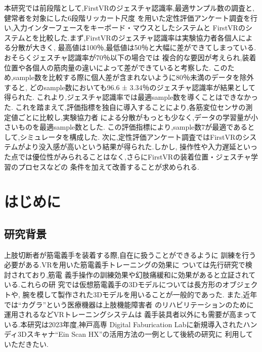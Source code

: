 \documentclass{ltjsreport}
\begin{document}
本研究では前段階として,FirstVRのジェスチャ認識率,最適サンプル数の調査と,健常者を対象にした6段階リッカート尺度
を用いた定性評価アンケート調査を行い,入力インターフェースをキーボード・マウスとしたシステムと
FirstVRのシステムとを比較した.まず,FirstVRのジェスチャ認識率は実験協力者各個人による分散が大きく,
最高値は100％,最低値は50％と大幅に差ができてしまっている.おそらくジェスチャ認識率が70％以下の場合では
複合的な要因が考えられ,装着位置や各個人の筋肉量の違いによって差ができていると考察した.
このため,sample数を比較する際に個人差が含まれないように80％未満のデータを除外すると,
どのsample数においても96.6 ± 3.34％のジェスチャ認識率が結果として得られた.
これより,ジェスチャ認識率では最適sample数を導くことはできなかった.
これを踏まえて,評価指標を独自に導入することにより,各筋変位センサの測定値ごとに比較し,実験協力者
による分散がもっとも少なく,データの学習量が小さいものを最適sample数とした.
この評価指標により,sample数7が最適であるとして,シミュレータを構成した.
次に,定性評価アンケート調査ではFirstVRのシステムがより没入感が高いという結果が得られた.しかし,
操作性や入力遅延といった点では優位性がみられることはなく,さらにFirstVRの装着位置・ジェスチャ学習のプロセスなどの
条件を加えて改善することが求められる.
\clearpage

\setcounter{tocdepth}{2}
\tableofcontents

\clearpage


\chapter{はじめに}
	\section{研究背景}
		上肢切断者が筋電義手を装着する際,自在に扱うことができるように
		訓練を行う必要がある.VRを用いた筋電義手トレーニングの効果に
		ついては先行研究\cite{ref:1}\cite{ref:2}で検討されており,筋電
		義手操作の訓練効果や幻肢痛緩和に効果があると立証されている.これらの研
		究では仮想筋電義手の3Dモデルについては長方形のオブジェクトや,
		腕を模して製作された3Dモデルを用いることが一般的であった.
		また,近年では``カグラ''\cite{ref:3}という医療機器は上肢機能障害者
		のリハビリテーションのために運用されるなどVRトレーニングシステムは
		義手装具者以外にも需要が高まっている.本研究は2023年度,神戸高専
		Digital Faburication Labに新規導入されたハンディ3Dスキャナ``Ein Scan HX''\cite{ref:4}の活用方法の一例として後続の研究に
		利用していただきたい.
\end{document}
